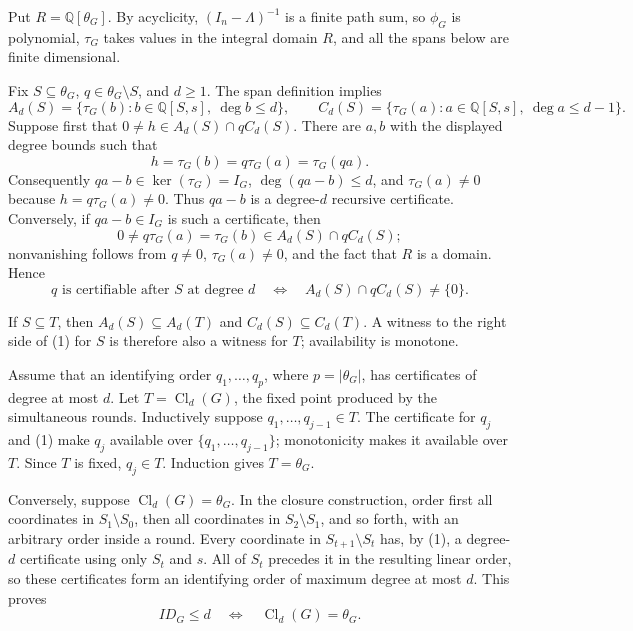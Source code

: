 Put \(R=\mathbb Q[\theta_G]\).  By acyclicity, \((I_n-\Lambda)^{-1}\) is a finite path sum, so \(\phi_G\) is polynomial, \(\tau_G\) takes values in the integral domain \(R\), and all the spans below are finite dimensional.

Fix \(S\subseteq\theta_G\), \(q\in\theta_G\setminus S\), and \(d\geq1\).  The span definition implies
\[
 A_d(S)=\{\tau_G(b):b\in\mathbb Q[S,s],\ \deg b\leq d\},\qquad
 C_d(S)=\{\tau_G(a):a\in\mathbb Q[S,s],\ \deg a\leq d-1\}.
\]
Suppose first that \(0\neq h\in A_d(S)\cap qC_d(S)\).  There are \(a,b\) with the displayed degree bounds such that
\[
 h=\tau_G(b)=q\tau_G(a)=\tau_G(qa).
\]
Consequently \(qa-b\in\ker(\tau_G)=I_G\), \(\deg(qa-b)\leq d\), and \(\tau_G(a)\neq0\) because \(h=q\tau_G(a)\neq0\).  Thus \(qa-b\) is a degree-\(d\) recursive certificate.  Conversely, if \(qa-b\in I_G\) is such a certificate, then
\[
 0\neq q\tau_G(a)=\tau_G(b)\in A_d(S)\cap qC_d(S);
\]
nonvanishing follows from \(q\neq0\), \(\tau_G(a)\neq0\), and the fact that \(R\) is a domain.  Hence
\[
 q\text{ is certifiable after }S\text{ at degree }d
 \quad\Longleftrightarrow\quad
 A_d(S)\cap qC_d(S)\neq\{0\}. \tag{1}
\]

If \(S\subseteq T\), then \(A_d(S)\subseteq A_d(T)\) and \(C_d(S)\subseteq C_d(T)\).  A witness to the right side of (1) for \(S\) is therefore also a witness for \(T\); availability is monotone.

Assume that an identifying order \(q_1,\ldots,q_p\), where \(p=|\theta_G|\), has certificates of degree at most \(d\).  Let \(T=\operatorname{Cl}_d(G)\), the fixed point produced by the simultaneous rounds.  Inductively suppose \(q_1,\ldots,q_{j-1}\in T\).  The certificate for \(q_j\) and (1) make \(q_j\) available over \(\{q_1,\ldots,q_{j-1}\}\); monotonicity makes it available over \(T\).  Since \(T\) is fixed, \(q_j\in T\).  Induction gives \(T=\theta_G\).

Conversely, suppose \(\operatorname{Cl}_d(G)=\theta_G\).  In the closure construction, order first all coordinates in \(S_1\setminus S_0\), then all coordinates in \(S_2\setminus S_1\), and so forth, with an arbitrary order inside a round.  Every coordinate in \(S_{t+1}\setminus S_t\) has, by (1), a degree-\(d\) certificate using only \(S_t\) and \(s\).  All of \(S_t\) precedes it in the resulting linear order, so these certificates form an identifying order of maximum degree at most \(d\).  This proves
\[
 ID_G\leq d\quad\Longleftrightarrow\quad\operatorname{Cl}_d(G)=\theta_G.
\]

